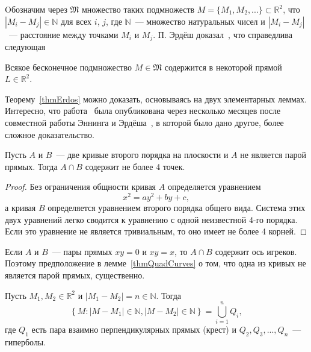 Oбозначим через $\mathfrak{M}$ множество таких подмножеств
$
	M = \{M_1, M_2, ... \}\subset \mathbb{R}^2
$,
что
$
	|M_i - M_j|\in\mathbb{N}
$
для всех $i$, $j$, где $\mathbb{N}$~--- множество натуральных чисел
и $|M_i - M_j|$~--- расстояние между точками $M_i$ и $M_j$.
П. Эрдёш доказал~\cite{erdos1945integral},
что справедлива следующая

\begin{theorem}
	\label{thmErdos}
	Всякое бесконечное подмножество $M\in\mathfrak{M}$
	содержится в некоторой прямой $L\in\mathbb{R}^2$.
\end{theorem}

Теорему~\ref{thmErdos} можно доказать, основываясь на двух элементарных леммах.
Интересно, что работа~\cite{erdos1945integral} была опубликована через несколько
месяцев после совместной работы Эннинга и Эрдёша~\cite{anning1945integral},
в которой было дано другое, более сложное доказательство.

\begin{lemma}
	\label{thmQuadCurves}
	Пусть $A$ и $B$~--- две кривые второго порядка на плоскости и $A$ не является парой прямых.
	Тогда $A\cap B$ содержит не более 4 точек.
\end{lemma}

\begin{proof}
	Без ограничения общности кривая $A$ определяется уравнением
	\begin{equation*}
		x^2 = ay^2 + by +c
		,
	\end{equation*}
	а кривая $B$ определяется уравнением второго порядка общего вида.
	Система этих двух уравнений легко сводится к уравнению с одной неизвестной 4-го порядка.
	Если это уравнение не является тривиальным, то оно имеет не более 4 корней.
\end{proof}

Если $A$ и $B$~--- пары прямых $xy=0$ и $xy=x$,
то $A\cap B$ содержит ось игреков.
Поэтому предположение в лемме~\ref{thmQuadCurves} о том,
что одна из кривых не является парой прямых, существенно.

\begin{lemma}
	\label{thm:quadCurveFamily}
	Пусть $M_1, M_2 \in \mathbb{R}^2$ и
	$|M_1 - M_2| = n \in \mathbb{N}$.
	Тогда
	\begin{equation}
		\label{eq:quadCurveFamily}
		\left\{
			M: |M-M_1|\in\mathbb{N}, |M-M_2|\in\mathbb{N}
		\right\}
		=\bigcup_{i=1}^n Q_i
		,
	\end{equation}
	где $Q_1$ есть пара взаимно перпендикулярных прямых (крест)
	и $Q_2, Q_3,...,Q_n$~--- гиперболы.
\end{lemma}

